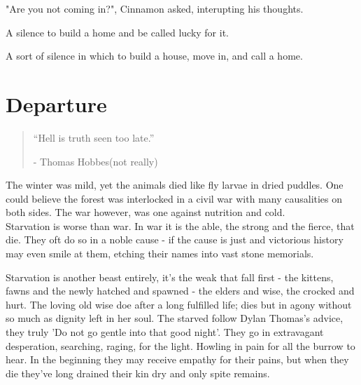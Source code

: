 \documentclass[smalldemyvopaper,11pt,twoside,onecolumn,openright,extrafontsizes]{memoir}
\begin{document}
"Are you not coming in?", Cinnamon asked, interupting his thoughts. 

A silence to build a home and be called lucky for it.

A sort of silence in which to build a house, move in, and call a home. 

\chapter{Departure}

\vspace{-1.3cm}
\begin{localsize}{10}
	\begin{quote}
		
	
	“Hell is truth seen too late.”
	\begin{flushright}- Thomas Hobbes(not really) \end{flushright}
	\end{quote} 
\end{localsize}
\vspace{1cm}


The winter was mild, yet the animals died like fly larvae in dried puddles. One could believe the forest was interlocked in a civil war with many causalities on both sides. The war however, was one against nutrition and cold. \\

Starvation is worse than war. In war it is the able, the strong and the fierce, that die. They oft do so in a noble cause - if the cause is just and victorious history may even smile at them, etching their names into vast stone memorials. 

Starvation is another beast entirely, it's the weak that fall first - the kittens, fawns and the newly hatched and spawned - the elders and wise, the crocked and hurt. The loving old wise doe after a long fulfilled life; dies but in agony without so much as dignity left in her soul. The starved follow Dylan Thomas's advice, they truly 'Do not go gentle into that good night'. They go in extravagant desperation, searching, raging, for the light. Howling in pain for all the burrow to hear. In the beginning they may receive empathy for their pains, but when they die they've long drained their kin dry and only spite remains.\\
\end{document}
